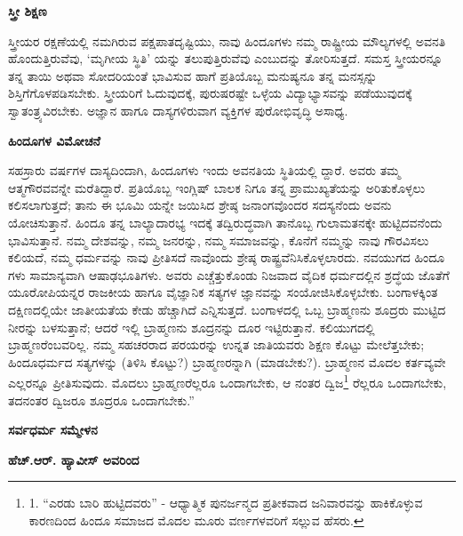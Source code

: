 \begin{center}
\textbf{ಸ್ತ್ರೀ ಶಿಕ್ಷಣ}
\end{center}

ಸ್ತ್ರೀಯರ ರಕ್ಷಣೆಯಲ್ಲಿ ನಮಗಿರುವ ಪಕ್ಷಪಾತದೃಷ್ಟಿಯು, ನಾವು ಹಿಂದೂಗಳು ನಮ್ಮ ರಾಷ್ಟ್ರೀಯ ಮೌಲ್ಯಗಳಲ್ಲಿ ಅವನತಿ ಹೊಂದುತ್ತಿರುವೆವು, ‘ಮೃಗೀಯ ಸ್ಥಿತಿ’ ಯನ್ನು ತಲುಪುತ್ತಿರುವೆವು ಎಂಬುದನ್ನು ತೋರಿಸುತ್ತದೆ. ಸಮಸ್ತ ಸ್ತ್ರೀಯರನ್ನೂ ತನ್ನ ತಾಯಿ ಅಥವಾ ಸೋದರಿಯಂತೆ ಭಾವಿಸುವ ಹಾಗೆ ಪ್ರತಿಯೊಬ್ಬ ಮನುಷ್ಯನೂ ತನ್ನ ಮನಸ್ಸನ್ನು ಶಿಸ್ತಿಗೆಗೊಳಪಡಿಸಬೇಕು. ಸ್ತ್ರೀಯರಿಗೆ ಓದುವುದಕ್ಕೆ, ಪುರುಷರಷ್ಟೇ ಒಳ್ಳೆಯ ವಿದ್ಯಾಭ್ಯಾಸವನ್ನು ಪಡೆಯುವುದಕ್ಕೆ ಸ್ವಾತಂತ್ರ್ಯವಿರಬೇಕು. ಅಜ್ಞಾನ ಹಾಗೂ ದಾಸ್ಯಗಳಿರುವಾಗ ವ್ಯಕ್ತಿಗಳ ಪುರೋಭಿವೃದ್ಧಿ ಅಸಾಧ್ಯ.

\begin{center}
\textbf{ಹಿಂದೂಗಳ ವಿಮೋಚನೆ}
\end{center}

ಸಹಸ್ರಾರು ವರ್ಷಗಳ ದಾಸ್ಯದಿಂದಾಗಿ, ಹಿಂದೂಗಳು ಇಂದು ಅವನತಿಯ ಸ್ಥಿತಿಯಲ್ಲಿ ದ್ದಾರೆ. ಅವರು ತಮ್ಮ ಆತ್ಮಗೌರವವನ್ನೇ ಮರೆತಿದ್ದಾರೆ. ಪ್ರತಿಯೊಬ್ಬ ಇಂಗ್ಲಿಷ್ ಬಾಲಕ ನಿಗೂ ತನ್ನ ಪ್ರಾಮುಖ್ಯತೆಯನ್ನು ಅರಿತುಕೊಳ್ಳಲು ಕಲಿಸಲಾಗುತ್ತದೆ; ತಾನು ಈ ಭೂಮಿ ಯನ್ನೇ ಜಯಿಸಿದ ಶ್ರೇಷ್ಠ ಜನಾಂಗವೊಂದರ ಸದಸ್ಯನೆಂದು ಅವನು ಯೋಚಿಸುತ್ತಾನೆ. ಹಿಂದೂ ತನ್ನ ಬಾಲ್ಯಾದಾರಭ್ಯ ಇದಕ್ಕೆ ತದ್ವಿರುದ್ಧವಾಗಿ ತಾನೊಬ್ಬ ಗುಲಾಮತನಕ್ಕೇ ಹುಟ್ಟಿದವನೆಂದು ಭಾವಿಸುತ್ತಾನೆ. ನಮ್ಮ ದೇಶವನ್ನು, ನಮ್ಮ ಜನರನ್ನು, ನಮ್ಮ ಸಮಾಜವನ್ನು, ಕೊನೆಗೆ ನಮ್ಮನ್ನು ನಾವು ಗೌರವಿಸಲು ಕಲಿಯದೆ, ನಮ್ಮ ಧರ್ಮವನ್ನು ನಾವು ಪ್ರೀತಿಸದೆ ನಾವೊಂದು ಶ್ರೇಷ್ಠ ರಾಷ್ಟ್ರವೆನಿಸಿಕೊಳ್ಳಲಾರದು. ನವಯುಗದ ಹಿಂದೂ ಗಳು ಸಾಮಾನ್ಯವಾಗಿ ಆಷಾಢಭೂತಿಗಳು. ಅವರು ಎಚ್ಚೆತ್ತುಕೊಂಡು ನಿಜವಾದ ವೈದಿಕ ಧರ್ಮದಲ್ಲಿನ ಶ್ರದ್ಧೆಯ ಜೊತೆಗೆ ಯೂರೋಪಿಯನ್ನರ ರಾಜಕೀಯ ಹಾಗೂ ವೈಜ್ಞಾನಿಕ ಸತ್ಯಗಳ ಜ್ಞಾನವನ್ನು ಸಂಯೋಜಿಸಿಕೊಳ್ಳಬೇಕು. ಬಂಗಾಳಕ್ಕಿಂತ ದಕ್ಷಿಣದಲ್ಲಿಯೇ ಜಾತೀಯತೆಯ ಕೇಡು ಹೆಚ್ಚಾಗಿದೆ ಎನ್ನಿಸುತ್ತದೆ. ಬಂಗಾಳದಲ್ಲಿ ಒಬ್ಬ ಬ್ರಾಹ್ಮಣನು ಶೂದ್ರರು ಮುಟ್ಟಿದ ನೀರನ್ನು ಬಳಸುತ್ತಾನೆ; ಆದರೆ ಇಲ್ಲಿ ಬ್ರಾಹ್ಮಣನು ಶೂದ್ರನನ್ನು ದೂರ ಇಟ್ಟಿರುತ್ತಾನೆ. ಕಲಿಯುಗದಲ್ಲಿ ಬ್ರಾಹ್ಮಣರೆಂಬವರಿಲ್ಲ. ನಮ್ಮ ಸಹಚರರಾದ ಪರಯರನ್ನು ಉನ್ನತ ಜಾತಿಯವರು ಶಿಕ್ಷಣ ಕೊಟ್ಟು ಮೇಲೆತ್ತಬೇಕು; ಹಿಂದೂಧರ್ಮದ ಸತ್ಯಗಳನ್ನು (ತಿಳಿಸಿ ಕೊಟ್ಟು?) ಬ್ರಾಹ್ಮಣರನ್ನಾಗಿ (ಮಾಡಬೇಕು?). ಬ್ರಾಹ್ಮಣನ ಮೊದಲ ಕರ್ತವ್ಯವೇ ಎಲ್ಲರನ್ನೂ ಪ್ರೀತಿಸುವುದು. ಮೊದಲು ಬ್ರಾಹ್ಮಣರೆಲ್ಲರೂ ಒಂದಾಗಬೇಕು, ಆ ನಂತರ ದ್ವಿಜ\footnote{1. “ಎರಡು ಬಾರಿ ಹುಟ್ಟಿದವರು” - ಆಧ್ಯಾತ್ಮಿಕ ಪುನರ್ಜನ್ಮದ ಪ್ರತೀಕವಾದ ಜನಿವಾರವನ್ನು ಹಾಕಿಕೊಳ್ಳುವ ಕಾರಣದಿಂದ ಹಿಂದೂ ಸಮಾಜದ ಮೊದಲ ಮೂರು ವರ್ಣಗಳವರಿಗೆ ಸಲ್ಲುವ ಹೆಸರು.} ರೆಲ್ಲರೂ ಒಂದಾಗಬೇಕು, ತದನಂತರ ದ್ವಿಜರೂ ಶೂದ್ರರೂ ಒಂದಾಗಬೇಕು.”

\begin{center}
\textbf{ಸರ್ವಧರ್ಮ ಸಮ್ಮೇಳನ}
\end{center}

\begin{center}
\textbf{ಹೆಚ್.ಆರ್. ಹ್ಯಾವೀಸ್ ಅವರಿಂದ}
\end{center}

